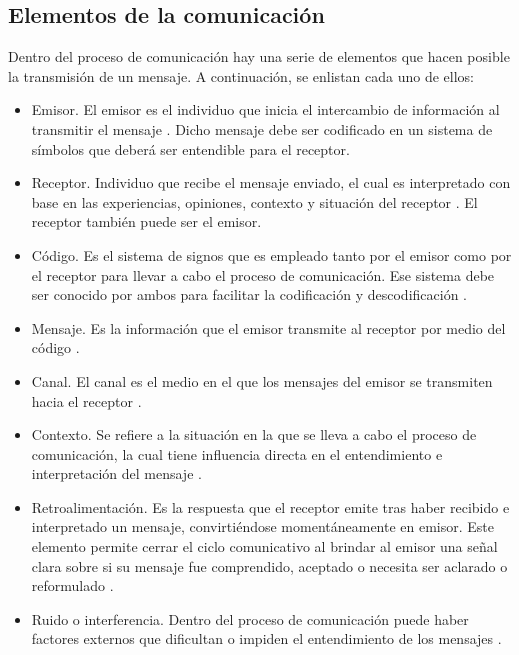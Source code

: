 \subsection{Elementos de la comunicación}
Dentro del proceso de comunicación hay una serie de elementos que hacen posible la transmisión de un mensaje. A continuación, se enlistan cada uno de ellos: 
\begin{itemize}
    
\item Emisor. El emisor es el individuo que inicia el intercambio de información al transmitir el mensaje \cite{ref22}. Dicho mensaje debe ser codificado en un sistema de símbolos que deberá ser entendible para el receptor. 

\item Receptor. Individuo que recibe el mensaje enviado, el cual es interpretado con base en las experiencias, opiniones, contexto y situación del receptor \cite{ref20}. El receptor también puede ser el emisor.

\item Código. Es el sistema de signos que es empleado tanto por el emisor como por el receptor para llevar a cabo el proceso de comunicación. Ese sistema debe ser conocido por ambos para facilitar la codificación y descodificación \cite{ref23}.

\item Mensaje. Es la información que el emisor transmite al receptor por medio del código \cite{ref24}.

\item Canal. El canal es el medio en el que los mensajes del emisor se transmiten hacia el receptor \cite{ref20}.

\item Contexto. Se refiere a la situación en la que se lleva a cabo el proceso de comunicación, la cual tiene influencia directa en el entendimiento e interpretación del mensaje \cite{ref24}.

\item Retroalimentación. Es la respuesta que el receptor emite tras haber recibido e interpretado un mensaje, convirtiéndose momentáneamente en emisor. Este elemento permite cerrar el ciclo comunicativo al brindar al emisor una señal clara sobre si su mensaje fue comprendido, aceptado o necesita ser aclarado o reformulado \cite{ref23}.

\item Ruido o interferencia. Dentro del proceso de comunicación puede haber factores externos que dificultan o impiden el entendimiento de los mensajes \cite{ref23}.
\end{itemize}

